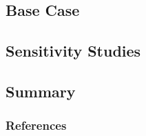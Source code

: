 \documentclass[9pt]{beamer}
\begin{document}
\subsection{Base Case}

\subsection{Sensitivity Studies}

\subsection{Summary}



\begin{frame}[allowframebreaks]
  \frametitle{References}
  
  {\footnotesize }
\end{frame}
\end{document}
